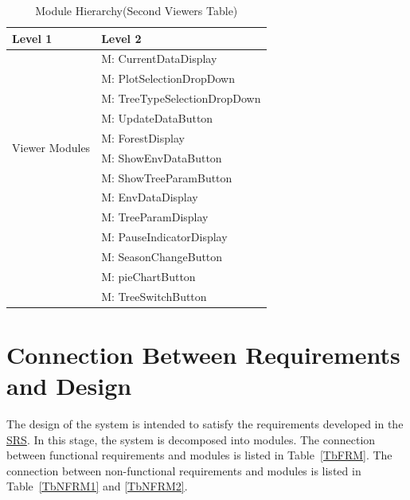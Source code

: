 \documentclass[12pt, titlepage]{article}
\newcounter{mnum}
\newcommand{\mthemnum}{M\themnum}
\begin{document}
\begin{table}[H]
\caption{Module Hierarchy(Second Viewers Table)}
\label{TblViewers2}

\centering
\begin{tabular}{p{} p{}}
\toprule
\textbf{Level 1} & \textbf{Level 2}\\
\midrule

\multirow{10}{0.3\textwidth}{Viewer Modules}
& {mnum} \mthemnum \label{Viwer14}: CurrentDataDisplay \\
& {mnum} \mthemnum \label{Viwer15}: PlotSelectionDropDown \\
& {mnum} \mthemnum \label{Viwer16}: TreeTypeSelectionDropDown \\
& {mnum} \mthemnum \label{Viwer17}: UpdateDataButton \\
& {mnum} \mthemnum \label{Viwer18}: ForestDisplay \\
& {mnum} \mthemnum \label{Viwer19}: ShowEnvDataButton \\
& {mnum} \mthemnum \label{Viwer20}: ShowTreeParamButton \\
& {mnum} \mthemnum \label{Viwer21}: EnvDataDisplay \\
& {mnum} \mthemnum \label{Viwer22}: TreeParamDisplay \\
& {mnum} \mthemnum \label{Viwer23}: PauseIndicatorDisplay \\
& {mnum} \mthemnum \label{Viwer24}: SeasonChangeButton \\
& {mnum} \mthemnum \label{Viwer25}: pieChartButton \\
& {mnum} \mthemnum \label{Viwer26}: TreeSwitchButton \\
\bottomrule
\end{tabular}
\end{table}

\newpage


\section{Connection Between Requirements and Design} \label{SecConnection}

The design of the system is intended to satisfy the requirements developed in
the  \href{https://github.com/wuj187/DigitalTwinCAS/blob/main/docs/DocRevision/SRSRevision/SRSRevision.pdf}{SRS}. In this stage, the system is decomposed into modules. The connection
between functional requirements and modules is listed in Table~\ref{TbFRM}. 
The connection
between non-functional requirements and modules is listed in Table~\ref{TbNFRM1} and \ref{TbNFRM2}.
\end{document}
